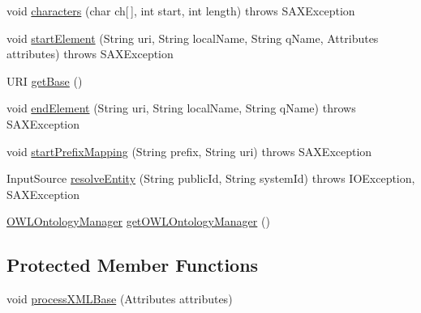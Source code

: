\begin{DoxyCompactItemize}
\item 
void \hyperlink{classorg_1_1coode_1_1owlapi_1_1owlxmlparser_1_1_o_w_l_x_m_l_parser_handler_a9fb2e001faebbbb463d265fe2497b5d0}{characters} (char ch\mbox{[}$\,$\mbox{]}, int start, int length)  throws S\-A\-X\-Exception 
\item 
void \hyperlink{classorg_1_1coode_1_1owlapi_1_1owlxmlparser_1_1_o_w_l_x_m_l_parser_handler_a88bcd01cf5324efac94bdb3cd3a77706}{start\-Element} (String uri, String local\-Name, String q\-Name, Attributes attributes)  throws S\-A\-X\-Exception 
\item 
U\-R\-I \hyperlink{classorg_1_1coode_1_1owlapi_1_1owlxmlparser_1_1_o_w_l_x_m_l_parser_handler_ac8b7c30cb0f9debb44c32875e2215f0f}{get\-Base} ()
\item 
void \hyperlink{classorg_1_1coode_1_1owlapi_1_1owlxmlparser_1_1_o_w_l_x_m_l_parser_handler_a0d087f143d79e5ecc7811c20264b5e98}{end\-Element} (String uri, String local\-Name, String q\-Name)  throws S\-A\-X\-Exception 
\item 
void \hyperlink{classorg_1_1coode_1_1owlapi_1_1owlxmlparser_1_1_o_w_l_x_m_l_parser_handler_a2af90d8237699927fe4efc23fbb45fe0}{start\-Prefix\-Mapping} (String prefix, String uri)  throws S\-A\-X\-Exception 
\item 
Input\-Source \hyperlink{classorg_1_1coode_1_1owlapi_1_1owlxmlparser_1_1_o_w_l_x_m_l_parser_handler_a9082a0603fbd6cdc30a1872703399bca}{resolve\-Entity} (String public\-Id, String system\-Id)  throws I\-O\-Exception, S\-A\-X\-Exception 
\item 
\hyperlink{interfaceorg_1_1semanticweb_1_1owlapi_1_1model_1_1_o_w_l_ontology_manager}{O\-W\-L\-Ontology\-Manager} \hyperlink{classorg_1_1coode_1_1owlapi_1_1owlxmlparser_1_1_o_w_l_x_m_l_parser_handler_a4c8d6c06088f50d7f34ee2b57ba4d2bc}{get\-O\-W\-L\-Ontology\-Manager} ()
\end{DoxyCompactItemize}
\subsection*{Protected Member Functions}
\begin{DoxyCompactItemize}
\item 
void \hyperlink{classorg_1_1coode_1_1owlapi_1_1owlxmlparser_1_1_o_w_l_x_m_l_parser_handler_ae7133468b52a662670dab976ac2918f4}{process\-X\-M\-L\-Base} (Attributes attributes)
\end{DoxyCompactItemize}
